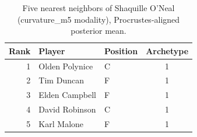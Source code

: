 \begin{table}[htbp]
  \centering\small
  \begin{tabular}{rllc}
    \toprule
    Rank & Player & Position & Archetype \\
    \midrule
    1 & Olden Polynice & C & 1 \\
    2 & Tim Duncan & F & 1 \\
    3 & Elden Campbell & F & 1 \\
    4 & David Robinson & C & 1 \\
    5 & Karl Malone & F & 1 \\
    \bottomrule
  \end{tabular}
  \caption{Five nearest neighbors of Shaquille O'Neal (curvature_m5 modality), Procrustes-aligned posterior mean.}
  \label{tab:Shaquille_O_Neal_neighbors_curvature_m5}
\end{table}

